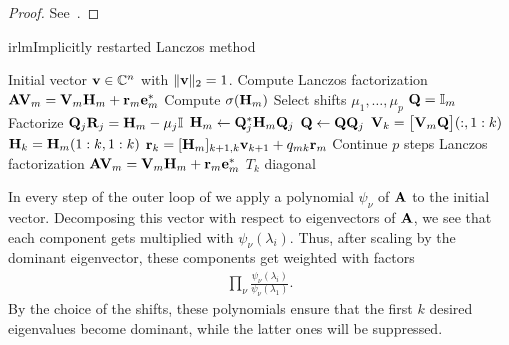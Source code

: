 \begin{proof}
  See~\cite[Section 4.5.1]{BaiDemmelDongarraRuhevanderVorst00}.
\end{proof}

\begin{Algorithm*}{irlm}{Implicitly restarted Lanczos method}
  \begin{algorithmic}[1]
    \Require Initial vector $\mathbf v\in\mathbb C^n$ with $\lVert\mathbf v\rVert_2=1$.
    \State Compute Lanczos factorization
    $\mathbf A\mathbf V_m = \mathbf V_m\mathbf H_m + \mathbf r_m\mathbf e_m^*$
    \Repeat
    \State Compute $\sigma(\mathbf H_m)$
    \State Select shifts $\mu_1,\dots,\mu_p$
    \State $\mathbf Q = \mathbb I_m$
    \State Factorize $\mathbf Q_j\mathbf R_j = \mathbf H_m - \mu_j\mathbb I$
    \State $\mathbf H_m \gets \mathbf Q_j^*\mathbf H_m\mathbf Q_j$
    \State $\mathbf Q \gets \mathbf Q\mathbf Q_j$
    \EndFor
    \State $\mathbf V_k = \bigl[\mathbf V_m\mathbf Q\bigr](:,1:k)$
    \State $\mathbf H_k = \mathbf H_m(1:k,1:k)$
    \State $\mathbf r_k= [\mathbf H_m]_{k+1,k}\mathbf v_{k+1} + q_{mk}\mathbf r_m$
    \State Continue $p$ steps Lanczos factorization
    $\mathbf A\mathbf V_m = \mathbf V_m\mathbf H_m + \mathbf r_m\mathbf e_m^*$
    \Until $T_k$ diagonal
  \end{algorithmic}
\end{Algorithm*}

\begin{remark}
  In every step of the outer loop of  we
  apply a polynomial $\psi_\nu$ of $\mathbf A$ to the initial
  vector. Decomposing this vector with respect to eigenvectors of
  $\mathbf A$, we see that each component gets multiplied with
  $\psi_\nu(\lambda_i)$. Thus, after scaling by the dominant
  eigenvector, these components get weighted with factors
  \begin{gather}
    \prod_\nu\frac{\psi_\nu(\lambda_i)}{\psi_\nu(\lambda_1)}.
  \end{gather}
  By the choice of the shifts, these polynomials ensure that the first
  $k$ desired eigenvalues become dominant, while the latter ones will
  be suppressed.
\end{remark}

